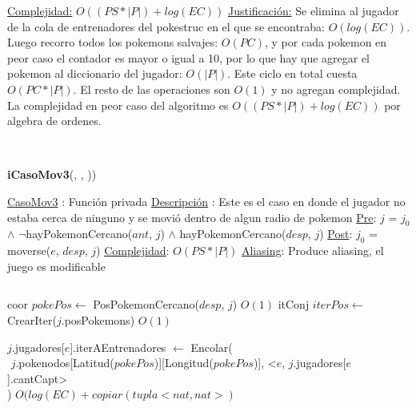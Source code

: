 \begin{Algoritmos}
\begin{algorithmic}[1]
\EndWhile 



\medskip
\Statex \underline{Complejidad:} $O((PS *|P|) + log(EC))$ 
\Statex \underline{Justificaci\'on:} Se elimina al jugador de la cola de entrenadores del pokestruc en el que se encontraba: $O(log(EC))$. Luego recorro todos los pokemons salvajes: $O(PC)$, y por cada pokemon en peor caso el contador es mayor o igual a 10, por lo que hay que agregar el pokemon al diccionario del jugador: $O(|P|)$. Este ciclo en total cuesta $O(PC*|P|)$. El resto de las operaciones son $O(1)$ y no agregan complejidad. La complejidad en peor caso del algoritmo es $O((PS *|P|) + log(EC))$ por algebra de ordenes.
\end{algorithmic}

$ $\newline
$ $\newline



{\textbf{iCasoMov3}(,  , ))}
\begin{algorithmic}[1]

\Statex \underline{CasoMov3} : Funci\'on privada 
\Statex \underline{Descripci\'on} : Este es el caso en donde el jugador no estaba cerca de ninguno y se movi\'o dentro de algun radio de pokemon
\Statex \underline{Pre}: $j$ = $j_0$ $\land$ $\neg$hayPokemonCercano($ant$, $j$) $\land$ hayPokemonCercano($desp$, $j$) 
\Statex \underline{Post}: $j_0$ = moverse($e$, $desp$, $j$) 
\Statex \underline{Complejidad}: $O(PS *|P|)$ 
\Statex \underline{Aliasing}: Produce aliasing, el juego es modificable

$ $\newline

\State coor $pokePos \gets$ PosPokemonCercano($desp$, $j$) \Comment $O(1)$
\State itConj $iterPos \gets$ CrearIter($j$.posPokemons) \Comment $O(1)$ 

\State $j$.jugadores[$e$].iterAEntrenadores $\gets$ Encolar(\\
$   $\hspace*{2cm}  $j$.pokenodos[Latitud($pokePos$)][Longitud($pokePos$)], <$e$, $j$.jugadores[$e$].cantCapt>\\
$   $\hspace*{1cm}) \Comment $O(log(EC) + copiar(tupla <nat, nat>)$


\end{algorithmic}
\end{Algoritmos}

